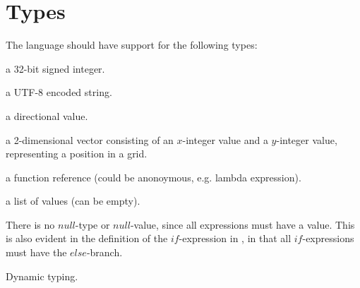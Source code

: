 \section{Types}

The language should have support for the following types:

\begin{description}[noitemsep]
\item[Integer] a 32-bit signed integer.
\item[String] a UTF-8 encoded string.
\item[Direction] a directional value.
\item[Coordinate] a 2-dimensional vector consisting of an $x$-integer value and
a $y$-integer value, representing a position in a grid.
\item[Function] a function reference (could be anonoymous, e.g. lambda expression).
\item[List] a list of values (can be empty).
\item[Action]
\end{description}

There is no $null$-type or $null$-value, since all expressions must have a value. This
is also evident in the definition of the $if$-expression in , in that
all $if$-expressions must have the $else$-branch.

Dynamic typing.


